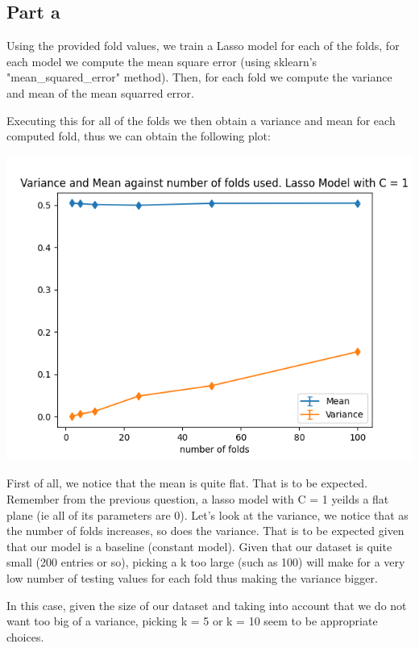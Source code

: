 \documentclass[10pt]{article}
\begin{document}
\subsection*{Part a}

Using the provided fold values, we train a Lasso model for each of the folds,
for each model we compute the mean square error (using sklearn's "mean\_squared\_error" method).
Then, for each fold we compute the variance and mean of the mean squarred error.

Executing this for all of the folds we then obtain a variance and mean for each computed fold, thus
we can obtain the following plot:

\begin{center}
    \includegraphics[scale=0.4]{Figure_9.png}
\end{center}


First of all, we notice that the mean is quite flat. That is to be expected. Remember from the previous question,
a lasso model with C = 1 yeilds a flat plane (ie all of its parameters are 0).
Let's look at the variance, we notice that as the number of folds increases, so does the variance.
That is to be expected given that our model is a baseline (constant model). Given that our dataset is quite small
(200 entries or so), picking a k too large (such as 100) will make for a very low number of testing values for each 
fold thus making the variance bigger.

In this case, given the size of our dataset and taking into account that we do not want too big of a variance,
picking k = 5 or k = 10 seem to be appropriate choices.
\end{document}
